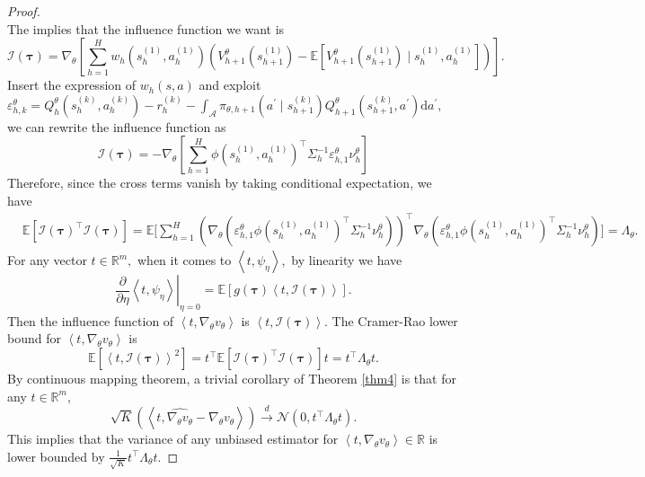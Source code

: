 \documentclass{article}
\numberwithin{equation}{section}
\begin{document}
\begin{proof}
\begin{equation*}
\end{equation*}
The implies that the influence function we want is
\begin{equation*}
    \mathcal{I}(\boldsymbol{\tau}) = \nabla_{\theta} \left[\sum_{h=1}^H w_{h}(s_h^{(1)}, a_h^{(1)}) \left( V_{h+1}^{\theta}\left(s_{h+1}^{(1)}\right)-\mathbb{E}\left[V_{h+1}^{\theta}\left(s_{h+1}^{(1)}\right) \mid s_h^{(1)}, a_h^{(1)}\right]\right)\right].
\end{equation*}
Insert the expression of $w_h(s,a)$ and exploit $\varepsilon_{h,k}^{\theta}=Q_{h}^{\theta}(s_h^{(k)}, a_h^{(k)})-r_h^{(k)}-\int_{\mathcal{A}} \pi_{\theta,h+1}\left(a^{\prime} \mid s_{h+1}^{(k)}\right) Q_{h+1}^{\theta}\left(s_{h+1}^{(k)}, a^{\prime}\right) \mathrm{d} a^{\prime},$ we can rewrite the influence function as
\begin{equation*}
    \mathcal{I}(\boldsymbol{\tau})=-\nabla_\theta\left[\sum_{h=1}^H\phi(s_h^{(1)},a_h^{(1)})^\top\Sigma_h^{-1}\varepsilon_{h,1}^\theta\nu_h^\theta\right]
\end{equation*}
Therefore, since the cross terms vanish by taking conditional expectation, we have
\begin{align*}
    &\mathbb{E}\left[\mathcal{I}(\boldsymbol{\tau})^{\top} \mathcal{I}(\boldsymbol{\tau})\right]=\mathbb{E}\Bigg[\sum_{h=1}^H\left(\nabla_\theta\left(\varepsilon^\theta_{h,1}\phi(s_h^{(1)},a_h^{(1)})^\top\Sigma^{-1}_h\nu_{h}^\theta\right)\right)^\top\nabla_\theta\left(\varepsilon^\theta_{h,1}\phi(s_h^{(1)},a_h^{(1)})^\top\Sigma^{-1}_h\nu_{h}^\theta \right)\Bigg]=\Lambda_{\theta}.
\end{align*}
For any vector $t \in \mathbb{R}^m,$ when it comes to $\left\langle t,\psi_{\eta}\right\rangle,$ by linearity we have
\begin{equation*}
    \left.\frac{\partial}{\partial \eta} \left\langle t,\psi_{\eta}\right\rangle\right|_{\eta=0}=\mathbb{E}[g(\boldsymbol{\tau}) \left\langle t,\mathcal{I}(\boldsymbol{\tau})\right\rangle].
\end{equation*}
Then the influence function of $\left\langle t,\nabla_{\theta}v_{\theta}\right\rangle$ is $\left\langle t,\mathcal{I}(\boldsymbol{\tau})\right\rangle.$ The Cramer-Rao lower bound for $\left\langle t,\nabla_{\theta}v_{\theta}\right\rangle$ is
\begin{equation*}
    \mathbb{E}\left[\left\langle t,\mathcal{I}(\boldsymbol{\tau})\right\rangle^2\right] = t^{\top} \mathbb{E}\left[\mathcal{I}(\boldsymbol{\tau})^{\top}\mathcal{I}(\boldsymbol{\tau})\right] t = t^{\top} \Lambda_{\theta} t.
\end{equation*}
By continuous mapping theorem, a trivial corollary of Theorem \ref{thm4} is that for any $t \in \mathbb{R}^m,$
\begin{equation*}
    \sqrt{K}\left(\left\langle t,\widehat{\nabla_{\theta} v_{\theta}}-\nabla_{\theta} v_{\theta}\right\rangle\right) \stackrel{d}{\rightarrow} \mathcal{N}\left(0, t^{\top} \Lambda_{\theta} t\right).
\end{equation*} 
This implies that the variance of any unbiased estimator for $\left\langle t, \nabla_{\theta} v_{\theta} \right\rangle \in \mathbb{R}$ is lower bounded by $\frac{1}{\sqrt{K}}t^{\top} \Lambda_{\theta} t.$
\end{proof}
\end{document}
